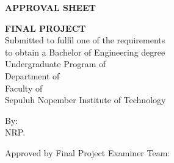 \begin{center}
  \large
  \textbf{APPROVAL SHEET}
\end{center}

\thispagestyle{empty}

\begin{center}
  \textbf{\engtatitle{}}
\end{center}

\begingroup
\small

\begin{center}
  \textbf{FINAL PROJECT}
  \\Submitted to fulfil one of the requirements \\
  to obtain a Bachelor of Engineering degree \\
  Undergraduate Program of \engstudyprogram{} \\
  Department of \engdepartment{} \\
  Faculty of \engfaculty{} \\
  Sepuluh Nopember Institute of Technology
\end{center}

\begin{center}
  By: \textbf{\name{}}
  \\NRP. \nrp{}
\end{center}

\begin{center}
  Approved by Final Project Examiner Team:
\end{center}

\begingroup
\setlength{\tabcolsep}{0pt}

